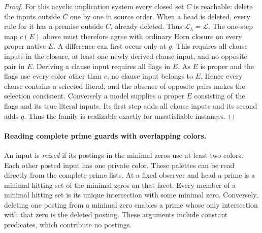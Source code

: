 \begin{proof}
For this acyclic implication system every closed set $C$ is reachable:
delete the inputs outside $C$ one by one in source order. When a head
is deleted, every rule for it has a premise outside $C$, already
deleted. Thus $\mathcal L_\lambda=\mathcal L$. The one-step map $c(E)$
above must therefore agree with ordinary Horn closure on every proper
native $E$. A difference can first occur only at $g$. This requires
all clause inputs in the closure, at least one newly derived clause
input, and no opposite pair in $E$. Deriving a clause input requires
all flags in $E$. As $E$ is proper and the flags use every color
other than $c$, no clause input belongs to $E$. Hence every clause
contains a selected literal, and the absence of opposite pairs
makes the selection consistent. Conversely a model supplies a
proper $E$ consisting of the flags and its true literal inputs.
Its first step adds all clause inputs and its second adds $g$.
Thus the family is realizable exactly for unsatisfiable instances.
\end{proof}

\paragraph{Reading complete prime guards with overlapping colors.}
An input is \emph{mixed} if its postings in the minimal zeros use
at least two colors. Each other posted input has one private color.
These palettes can be read directly from the complete prime lists.
At a fixed observer and head a prime is a minimal hitting set of the
minimal zeros on that facet. Every member of a minimal hitting set is
its unique intersection with some minimal zero. Conversely, deleting
one posting from a minimal zero enables a prime whose only intersection
with that zero is the deleted posting. These arguments include
constant predicates, which contribute no postings.

